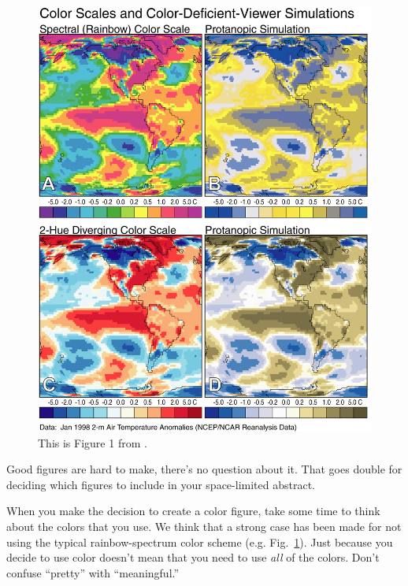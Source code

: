 \documentclass[twoside, 10pt]{article}
\begin{document}
\begin{figure}[b]
\begin{center}
\includegraphics[width=\columnwidth]{lb_fig1.png}
\caption[Color Scales and Color-Deficient-Viewer Simulations]{
    \label{color_scales}
    This is Figure 1 from \cite{light2004end}.}
\end{center}
\end{figure}

Good figures are hard to make, there's no question about it.  That
goes double for deciding which figures to include in your 
space-limited abstract.

When you make the decision to create a color figure, take some time
to think about the colors that you use.  We think that a  strong case has 
been made \citep{light2004end,borland2007rainbow} for not using the
typical rainbow-spectrum color scheme (e.g. Fig.~\ref{color_scales}).
Just because you decide to use color doesn't mean that you need to
use \emph{all} of the colors.  Don't confuse ``pretty'' with
``meaningful.''
\end{document}
